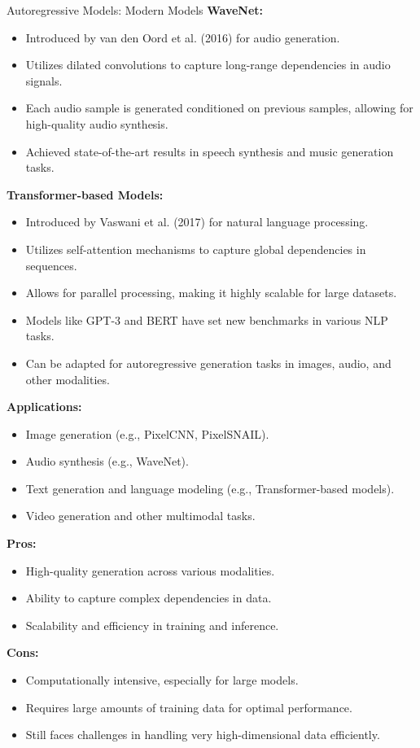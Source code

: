 \begin{frame}[allowframebreaks]{Autoregressive Models: Modern Models}
    \textbf{WaveNet:}
    \begin{itemize}
        \item Introduced by van den Oord et al. (2016) for audio generation.
        \item Utilizes dilated convolutions to capture long-range dependencies in audio signals.
        \item Each audio sample is generated conditioned on previous samples, allowing for high-quality audio synthesis.
        \item Achieved state-of-the-art results in speech synthesis and music generation tasks.
    \end{itemize}
    \framebreak
    \textbf{Transformer-based Models:}
    \begin{itemize}
        \item Introduced by Vaswani et al. (2017) for natural language processing.
        \item Utilizes self-attention mechanisms to capture global dependencies in sequences.
        \item Allows for parallel processing, making it highly scalable for large datasets.
        \item Models like GPT-3 and BERT have set new benchmarks in various NLP tasks.
        \item Can be adapted for autoregressive generation tasks in images, audio, and other modalities.
    \end{itemize}
    \framebreak
    \textbf{Applications:}
    \begin{itemize}
        \item Image generation (e.g., PixelCNN, PixelSNAIL).
        \item Audio synthesis (e.g., WaveNet).
        \item Text generation and language modeling (e.g., Transformer-based models).
        \item Video generation and other multimodal tasks.
    \end{itemize}
    \framebreak
    \textbf{Pros:}
    \begin{itemize}
        \item High-quality generation across various modalities.
        \item Ability to capture complex dependencies in data.
        \item Scalability and efficiency in training and inference.
    \end{itemize}
    \textbf{Cons:}
    \begin{itemize}
        \item Computationally intensive, especially for large models.
        \item Requires large amounts of training data for optimal performance.
        \item Still faces challenges in handling very high-dimensional data efficiently.
    \end{itemize}
\end{frame}
